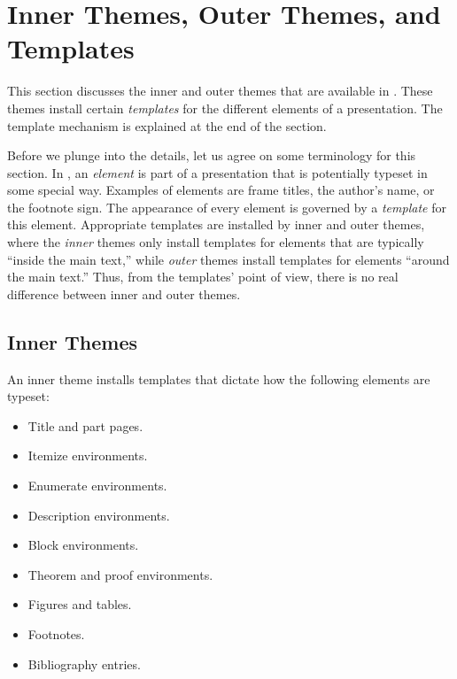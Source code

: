 %
%
%

\section{Inner Themes, Outer Themes, and Templates}
\label{section-elements}

This section discusses the inner and outer themes that are available in \beamer. These themes install certain \emph{templates} for the different elements of a presentation. The template mechanism is explained at the end of the section.

Before we plunge into the details, let us agree on some terminology for this section. In \beamer, an \emph{element} is part of a presentation that is potentially typeset in some special way. Examples of elements are frame titles, the author's name, or the footnote sign. The appearance of every element is governed by a \emph{template} for this element. Appropriate templates are installed by inner and outer themes, where the \emph{inner} themes only install templates for elements that are typically ``inside the main text,'' while \emph{outer} themes install templates for elements ``around the main text.'' Thus, from the templates' point of view, there is no real difference between inner and outer themes.


\subsection{Inner Themes}

An inner theme installs templates that dictate how the following elements are typeset:
\begin{itemize}
\item Title and part pages.
\item Itemize environments.
\item Enumerate environments.
\item Description environments.
\item Block environments.
\item Theorem and proof environments.
\item Figures and tables.
\item Footnotes.
\item Bibliography entries.
\end{itemize}

